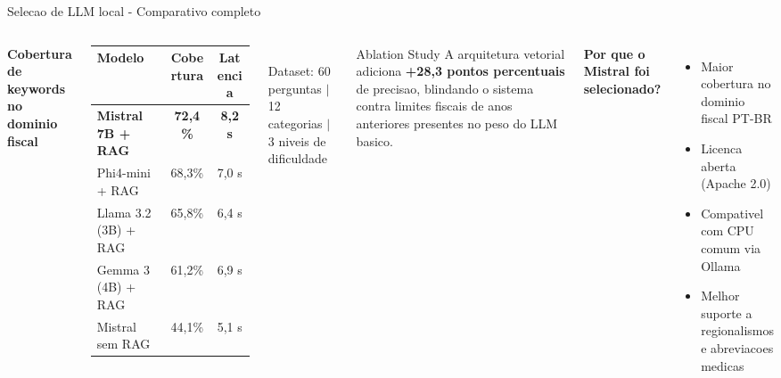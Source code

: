 \documentclass[aspectratio=169,12pt]{beamer}
\begin{document}
\begin{frame}{Selecao de LLM local - Comparativo completo}
\begin{columns}[T]
  \textcolor{declaraOrange}{\textbf{Cobertura de keywords no dominio fiscal}}\\[0.25cm]
  \begin{tabular}{@{}L{3.4cm}cc@{}}
    \toprule
    \textbf{Modelo} & \textbf{Cobertura} & \textbf{Latencia} \\
    \midrule
    \textbf{Mistral 7B + RAG} & \textbf{72,4\%} & \textbf{8,2 s} \\
    Phi4-mini + RAG & 68,3\% & 7,0 s \\
    Llama 3.2 (3B) + RAG & 65,8\% & 6,4 s \\
    Gemma 3 (4B) + RAG & 61,2\% & 6,9 s \\
    \midrule
    \textcolor{declaraGray}{Mistral sem RAG} & \textcolor{declaraGray}{44,1\%} & \textcolor{declaraGray}{5,1 s} \\
    \bottomrule
  \end{tabular}\\[0.3cm]
  \footnotesize\color{declaraGray}
  Dataset: 60 perguntas $|$ 12 categorias $|$ 3 niveis de dificuldade
  \begin{block}{Ablation Study}
    \small A arquitetura vetorial adiciona
    \textbf{+28,3 pontos percentuais} de precisao, blindando o sistema
    contra limites fiscais de anos anteriores presentes no peso do LLM basico.
  \end{block}
  \vspace{0.3cm}
  \textcolor{declaraOrange}{\textbf{Por que o Mistral foi selecionado?}}
  \begin{itemize}\small
    \item Maior cobertura no dominio fiscal PT-BR
    \item Licenca aberta (Apache 2.0)
    \item Compativel com CPU comum via Ollama
    \item Melhor suporte a regionalismos e abreviacoes medicas
  \end{itemize}
\end{columns}
\end{frame}
\end{document}
